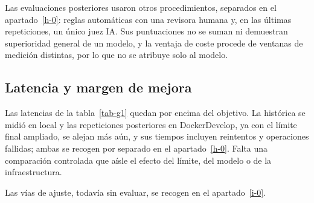 Las evaluaciones posteriores usaron otros procedimientos, separados en el apartado~\ref{h-0}: reglas automáticas con una revisora humana y, en las últimas repeticiones, un único juez IA. Sus puntuaciones no se suman ni demuestran superioridad general de un modelo, y la ventaja de coste procede de ventanas de medición distintas, por lo que no se atribuye solo al modelo. \cite{evaluacion}

\subsection{Latencia y margen de mejora}\label{g-4}

Las latencias de la tabla~\ref{tab-g1} quedan por encima del objetivo. La histórica se midió en local y las repeticiones posteriores en DockerDevelop, ya con el límite final ampliado, se alejan más aún, y sus tiempos incluyen reintentos y operaciones fallidas; ambas se recogen por separado en el apartado~\ref{h-0}. Falta una comparación controlada que aísle el efecto del límite, del modelo o de la infraestructura. \cite{evaluacion}

Las vías de ajuste, todavía sin evaluar, se recogen en el apartado~\ref{i-0}.
